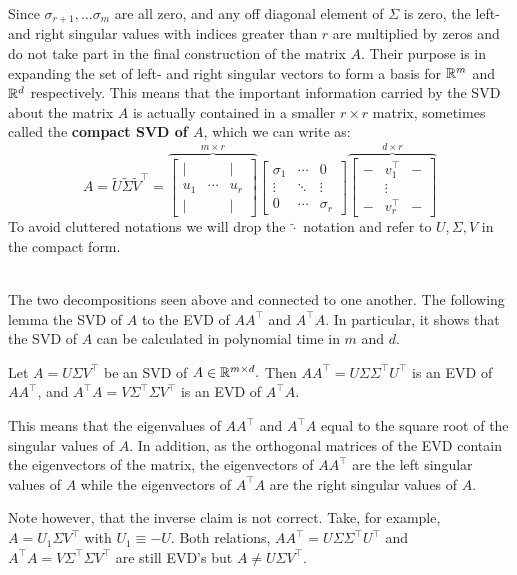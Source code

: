 Since $\sigma_{r+1},\ldots \sigma_m$ are all zero, and any off diagonal element of $\Sigma$ is zero, the left- and right singular values with indices greater than $r$ are multiplied by zeros and do not take part in the final construction of the matrix $A$. Their purpose is in expanding the set of left- and right singular vectors to form a basis for $\mathbb{R}^m$ and $\mathbb{R}^d$ respectively. This means that the important information carried by the SVD about the matrix $A$ is actually contained in a smaller $r\times r$ matrix, sometimes called the \textbf{compact SVD of $A$}, which we can write as:
$$
A=\tilde{U}\tilde{\Sigma}\tilde{V}^{\top}=\overset{m\times r}{\overbrace{\left[\begin{array}{ccc}
		| &  & |\\
		u_{1} & \cdots & u_{r}\\
		| &  & |
		\end{array}\right]}}\left[\begin{array}{ccc}
\sigma_{1} & \cdots & 0\\
\vdots & \ddots & \vdots\\
0 & \cdots & \sigma_{r}
\end{array}\right]\overset{d\times r}{\overbrace{\left[\begin{array}{ccc}
		- & v_{1}^{\top} & -\\
		& \vdots\\
		- & v_{r}^{\top} & -
		\end{array}\right]}}
$$
To avoid cluttered notations we will drop the $\widetilde{\cdot}$ notation and refer to $U,\Sigma,V$ in the compact form.


~\\The two decompositions seen above and connected to one another. The following lemma the SVD of $A$ to the EVD of $AA^{\top}$ and $A^{\top}A$. In particular, it shows that the SVD of $A$ can be calculated in polynomial time in $m$ and $d$.

\begin{lemma}
Let $A=U\Sigma V^{\top}$ be an SVD of $A\in\mathbb{R}^{m\times d}.$ Then  $AA^{\top}=U\Sigma\Sigma^{\top}U^{\top}$ is an EVD of $AA^{\top}$, and $A^{\top}A=V\Sigma^{\top}\Sigma V^{\top}$ is an EVD of $A^{\top}A$.
\end{lemma}

This means that the eigenvalues of $AA^\top$ and $A^\top A$ equal to the square root of the singular values of $A$. In addition, as the orthogonal matrices of the EVD contain the eigenvectors of the matrix, the eigenvectors of $AA^\top$ are the left singular values of $A$ while the eigenvectors of $A^\top A$ are the right singular values of $A$.

\begin{remark}
Note however, that the inverse claim is not correct. Take, for example, $A=U_1\Sigma V^{\top}$ with $U_1 \equiv -U$. Both relations, $AA^{\top}=U\Sigma\Sigma^{\top}U^{\top}$ and $A^{\top}A=V\Sigma^{\top}\Sigma V^{\top}$ are still EVD's but $A\neq U\Sigma V^{\top}.$
\end{remark}